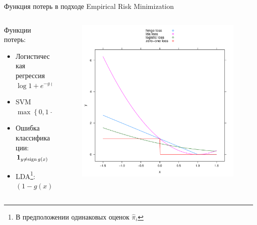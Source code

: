 \begin{frame}{Функция потерь в подходе Empirical Risk Minimization}
	\begin{columns}
		\begin{column}{0.5\textwidth}
			Функции потерь:
			\begin{itemize}
				\item Логистическая регрессия
					$ \log{1+e^{-g\left(x\right)y}}$
				\item SVM
					$ \max\left\{0, 1-g\left(x\right)y\right\}$
				\item Ошибка классификации: $ \mathbf{1}_{y\neq\operatorname{sign}{g\left(x\right)}} $
                \item LDA\footnote{В предположении одинаковых оценок $\hat{\pi}_i$}: $\left(1-g\left(x\right)\right)^2$
			\end{itemize}
		\end{column}
		\begin{column}{0.5\textwidth}
	\begin{figure}
		\includegraphics[width=1.0\textwidth]{loss.pdf}
	\end{figure}
		\end{column}
	\end{columns}
\end{frame}

